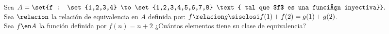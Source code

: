 \ejercicio
Sea $A = \set{f : \set{1,2,3,4} \to \set{1,2,3,4,5,6,7,8} \text{ tal que $f$ es una función inyectiva}}.$\\
Sea $\relacion$ la relación de equivalencia en $A$ definida por: $f \relacion g \sisolosi f(1) + f(2) = g(1) + g(2)$.\\
Sea $f \en A$ la función definida por $f(n) = n+2$ ¿Cuántos elementos tiene su clase de equivalencia?

\separadorCorto

\Hacer
